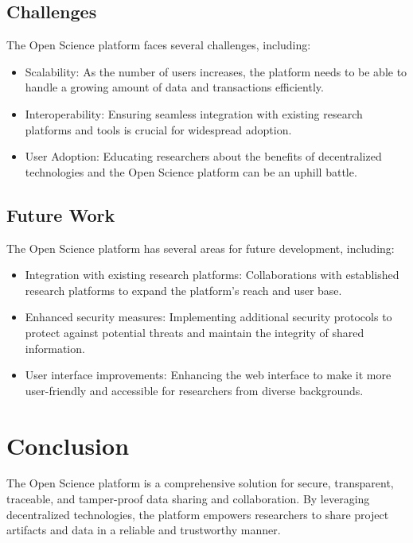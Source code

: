 \documentclass{article}
\begin{document}
\subsection{Challenges}

The Open Science platform faces several challenges, including:

\begin{itemize}
      \item Scalability: As the number of users increases, the platform needs to be able to handle a growing amount of data and transactions efficiently.
      \item Interoperability: Ensuring seamless integration with existing research platforms and tools is crucial for widespread adoption.
      \item User Adoption: Educating researchers about the benefits of decentralized technologies and the Open Science platform can be an uphill battle.
\end{itemize}

\subsection{Future Work}

The Open Science platform has several areas for future development, including:

\begin{itemize}
      \item Integration with existing research platforms: Collaborations with established research platforms to expand the platform's reach and user base.
      \item Enhanced security measures: Implementing additional security protocols to protect against potential threats and maintain the integrity of shared information.
      \item User interface improvements: Enhancing the web interface to make it more user-friendly and accessible for researchers from diverse backgrounds.
\end{itemize}

\section{Conclusion}
The Open Science platform is a comprehensive solution for secure, transparent, traceable, and tamper-proof data sharing and collaboration. By leveraging decentralized technologies, the platform empowers researchers to share project artifacts and data in a reliable and trustworthy manner.
\end{document}
